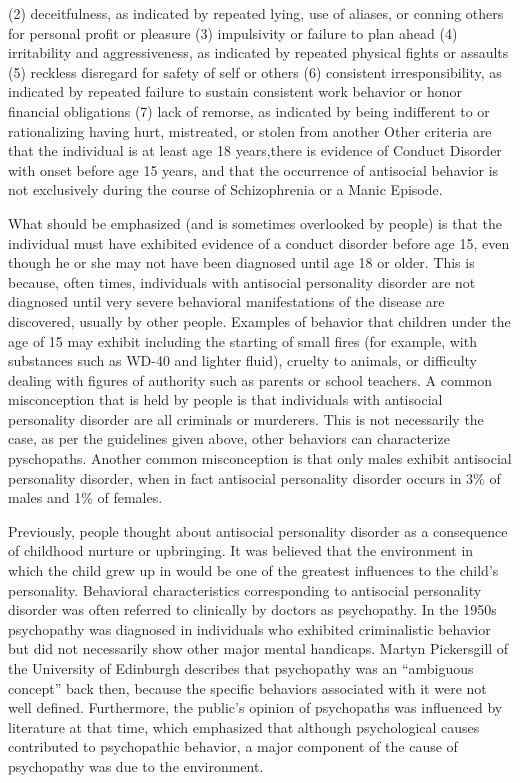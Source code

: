     (2) deceitfulness, as indicated by repeated lying, use of aliases, or conning others for personal profit or pleasure 
    (3) impulsivity or failure to plan ahead 
    (4) irritability and aggressiveness, as indicated by repeated physical fights or assaults 
    (5) reckless disregard for safety of self or others 
    (6) consistent irresponsibility, as indicated by repeated failure to sustain consistent work behavior or honor financial obligations 
    (7) lack of remorse, as indicated by being indifferent to or rationalizing having hurt, mistreated, or stolen from another 
Other criteria are that the individual is at least age 18 years,there is evidence of Conduct Disorder with onset before age 15 years, and that the occurrence of antisocial behavior is not exclusively during the course of Schizophrenia or a Manic Episode.

What should be emphasized (and is sometimes overlooked by people) is that the individual must have exhibited evidence of a conduct disorder before age 15, even though he or she may not have been diagnosed until age 18 or older. This is because, often times, individuals with antisocial personality disorder are not diagnosed until very severe behavioral manifestations of the disease are discovered, usually by other people. Examples of behavior that children under the age of 15 may exhibit including the starting of small fires (for example, with substances such as WD-40 and lighter fluid), cruelty to animals, or difficulty dealing with figures of authority such as parents or school teachers.  A common misconception that is held by people is that individuals with antisocial personality disorder are all criminals or murderers. \cite{yt-xbadaboom}This is not necessarily the case, as per the guidelines given above, other behaviors can characterize pyschopaths. Another common misconception is that only males exhibit antisocial personality disorder, when in fact antisocial personality disorder occurs in 3\% of males and 1\% of females. \cite{pickersgill}
	
Previously, people thought about antisocial personality disorder as a consequence of childhood nurture or upbringing. It was believed that the environment in which the child grew up in would be one of the greatest influences to the child's personality. Behavioral characteristics corresponding to antisocial personality disorder was often referred to clinically by doctors as psychopathy. In the 1950s psychopathy was diagnosed in individuals who exhibited criminalistic behavior but did not necessarily show other major mental handicaps. Martyn Pickersgill of the University of Edinburgh describes that psychopathy was an “ambiguous concept” back then, because the specific behaviors associated with it were not well defined. \cite{pickersgill} Furthermore, the public's opinion of psychopaths was influenced by literature at that time, which emphasized that although psychological causes contributed to psychopathic behavior, a major component of the cause of psychopathy was due to the environment. \cite{pickersgill} 
	
